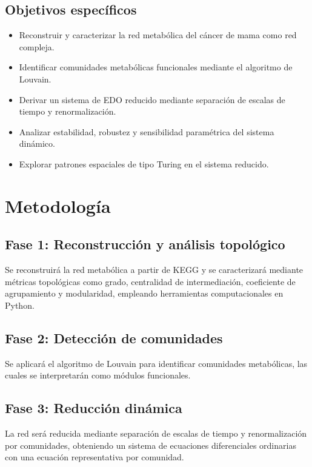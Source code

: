 \documentclass[12pt,spanish]{article}
\begin{document}
	\subsection{Objetivos específicos}
	
	\begin{itemize}
		\item Reconstruir y caracterizar la red metabólica del cáncer de mama como red compleja.
		\item Identificar comunidades metabólicas funcionales mediante el algoritmo de Louvain.
		\item Derivar un sistema de EDO reducido mediante separación de escalas de tiempo y renormalización.
		\item Analizar estabilidad, robustez y sensibilidad paramétrica del sistema dinámico.
		\item Explorar patrones espaciales de tipo Turing en el sistema reducido.
	\end{itemize}
	
	\section{Metodología}
	
	\subsection{Fase 1: Reconstrucción y análisis topológico}
	
	Se reconstruirá la red metabólica a partir de KEGG y se caracterizará mediante métricas topológicas como grado, centralidad de intermediación, coeficiente de agrupamiento y modularidad, empleando herramientas computacionales en Python.
	
	\subsection{Fase 2: Detección de comunidades}
	
	Se aplicará el algoritmo de Louvain para identificar comunidades metabólicas, las cuales se interpretarán como módulos funcionales.
	
	\subsection{Fase 3: Reducción dinámica}
	
	La red será reducida mediante separación de escalas de tiempo y renormalización por comunidades, obteniendo un sistema de ecuaciones diferenciales ordinarias con una ecuación representativa por comunidad.
	
\end{document}
